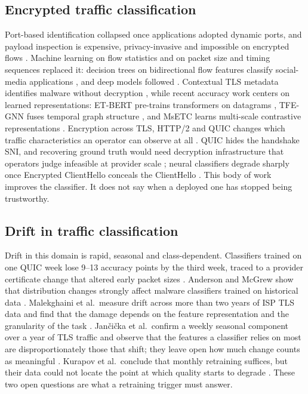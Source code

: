 \documentclass[conference]{IEEEtran}
\begin{document}
\subsection{Encrypted traffic classification}
Port-based identification collapsed once applications adopted dynamic ports, and payload inspection is expensive, privacy-invasive and impossible on encrypted flows \cite{goli2018}. Machine learning on flow statistics and on packet size and timing sequences replaced it: decision trees on bidirectional flow features classify social-media applications \cite{alobaidy2019}, and deep models followed \cite{rachmawati2021}. Contextual TLS metadata identifies malware without decryption \cite{anderson2016}, while recent accuracy work centers on learned representations: ET-BERT pre-trains transformers on datagrams \cite{lin2022}, TFE-GNN fuses temporal graph structure \cite{zhang2023}, and MsETC learns multi-scale contrastive representations \cite{yang2024}. Encryption across TLS, HTTP/2 and QUIC changes which traffic characteristics an operator can observe at all \cite{akbari2021}. QUIC hides the handshake SNI, and recovering ground truth would need decryption infrastructure that operators judge infeasible at provider scale \cite{luxemburk2023}; neural classifiers degrade sharply once Encrypted ClientHello conceals the ClientHello \cite{shamsimukhametov2022}. This body of work improves the classifier. It does not say when a deployed one has stopped being trustworthy.

\subsection{Drift in traffic classification}
Drift in this domain is rapid, seasonal and class-dependent. Classifiers trained on one QUIC week lose 9--13 accuracy points by the third week, traced to a provider certificate change that altered early packet sizes \cite{luxemburk2023}. Anderson and McGrew show that distribution changes strongly affect malware classifiers trained on historical data \cite{anderson2017}. Malekghaini et al.\ measure drift across more than two years of ISP TLS data and find that the damage depends on the feature representation and the granularity of the task \cite{malekghaini2023}. Jan\v{c}i\v{c}ka et al.\ confirm a weekly seasonal component over a year of TLS traffic and observe that the features a classifier relies on most are disproportionately those that shift; they leave open how much change counts as meaningful \cite{jancicka2024}. Kurapov et al.\ conclude that monthly retraining suffices, but their data could not locate the point at which quality starts to degrade \cite{kurapov2024}. These two open questions are what a retraining trigger must answer.
\end{document}
